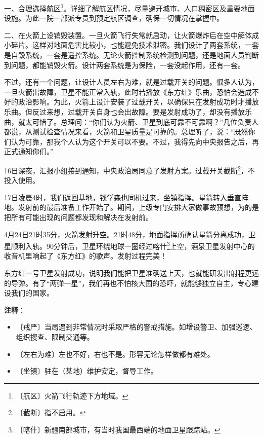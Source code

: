 \documentclass[12pt,UTF-8,openany]{ctexbook}
\begin{document}
\begin{normalsize}
    一、合理选择航区\footnote{〔航区〕火箭飞行轨迹下方地域。}。详细了解航区情况，尽量避开城市、人口稠密区及重要地面设施。为此一院一部派专员到预定航区调查，确保一切情况在掌握中。
    
    二、在火箭上设销毁装置。一旦火箭飞行失常就启动，让火箭爆炸后在空中解体成小碎片。这样对地面危害比较小，也能避免技术泄密。我们设计了两套系统，一套是自毁系统，一套是遥控系统。无论火箭控制系统检测到问题，还是地面人员判断到问题，都能销毁火箭。设计两套系统是为保险，一套没起作用，还有一套。
    
    不过，还有一个问题，让设计人员左右为难，就是过载开关的问题。很多人认为，一旦火箭出故障，卫星不能正常入轨，此时若播放《东方红》乐曲，恐怕会造成不好的政治影响。为此，火箭上设计安装了过载开关，以确保只在发射成功时才播放乐曲。但反过来想，过载开关自身也会出故障。要是发射成功了，却没有播放乐曲，就太可惜了。总理问：“你们认为火箭、卫星到底可靠不可靠啊？”几位负责人都说，从测试检查情况来看，火箭和卫星质量是可靠的。总理听了，说：“既然你们认为可靠，那我个人认为这个开关可以不要。不过，我得先向中央报告之后，再正式通知你们。”
    
    16日深夜，汇报小组接到通知，中央政治局同意了发射方案。过载开关截断\footnote{〔截断〕指不启用。}，不投入使用。
    
    17日凌晨4时，我们返回基地，钱学森也同机过来，坐镇指挥。星箭转入垂直阵地。发射前的最后准备工作开始了。期间，上级专门安排大家做事故预想，为的是把所有可能出现的问题都发现和解决在发射前。
    
    4月24日21时35分，火箭发射升空。21时48分，地面指挥所确认星箭分离成功，卫星顺利入轨。90分钟后，卫星环绕地球一圈经过喀什\footnote{〔喀什〕新疆南部城市，有当时我国最西端的地面卫星跟踪站。}上空，酒泉卫星发射中心的收音机里响起了《东方红》的歌声。发射过程完美！
    
    东方红一号卫星发射成功，说明我们能把卫星准确送上天，也就能研发出射程更远的导弹。有了“两弹一星”，我们再也不怕核大国的恐吓，就能够独立自主，专心建设我们的国家。
    
\end{normalsize}


\newpage

\textbf{注释}：

\vspace{-1em}

\begin{itemize}
    \setlength\itemsep{-0.2em}
    \item 〔戒严〕当局遇到非常情况时采取严格的警戒措施。如增设警卫、加强巡逻、组织搜查、限制交通等。
    \item 〔左右为难〕左也不好，右也不是。形容无论怎样做都有难处。
    \item 〔坐镇〕驻在（某地）维护安定，督导工作。
\end{itemize}
\end{document}
